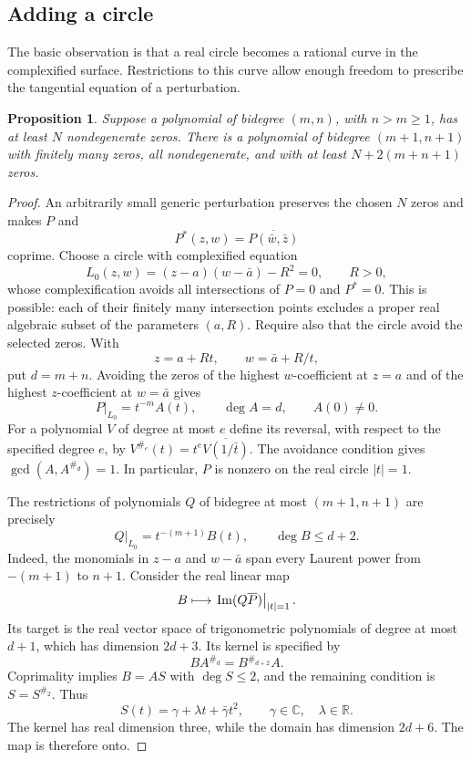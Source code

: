 \documentclass[UTF8,11pt]{ctexart}
\newtheorem{prop}[thm]{Proposition}
\theoremstyle{definition}
\numberwithin{equation}{section}
\newcommand{\C}{\mathbb C}\newcommand{\R}{\mathbb R}
\begin{document}
\subsection{Adding a circle}
The basic observation is that a real circle becomes a rational curve
in the complexified surface. Restrictions to this curve allow enough
freedom to prescribe the tangential equation of a perturbation.
\begin{prop}\label{b:prop:circleaddition}
Suppose a polynomial of bidegree $(m,n)$, with $n>m\ge1$, has at
least $N$ nondegenerate zeros. There is a polynomial of bidegree
$(m+1,n+1)$ with finitely many zeros, all nondegenerate, and with
at least $N+2(m+n+1)$ zeros.
\end{prop}
\begin{proof}
An arbitrarily small generic perturbation preserves the chosen $N$
zeros and makes $P$ and
\[
 P^*(z,w)=\overline{P(\bar w,\bar z)}
\]
coprime. Choose a circle with complexified equation
\[
 L_0(z,w)=(z-a)(w-\bar a)-R^2=0,\qquad R>0,
\]
whose complexification avoids all intersections of $P=0$ and $P^*=0$.
This is possible: each of their finitely many intersection points
excludes a proper real algebraic subset of the parameters $(a,R)$.
Require also that the circle avoid the selected zeros. With
\[
 z=a+Rt,\qquad w=\bar a+R/t,
\]
put $d=m+n$. Avoiding the zeros of the highest $w$-coefficient at $z=a$ and
of the highest $z$-coefficient at $w=\bar a$ gives
\[
 P|_{L_0}=t^{-m}A(t),\qquad \deg A=d,\qquad A(0)\ne0.
\]
For a polynomial $V$ of degree at most $e$ define its reversal, with
respect to the specified degree $e$, by
$V^{\#_e}(t)=t^e\overline{V(1/\bar t)}$.
The avoidance condition gives $\gcd(A,A^{\#_d})=1$.
In particular, $P$ is nonzero on the real circle $|t|=1$.

The restrictions of polynomials $Q$ of bidegree at most
$(m+1,n+1)$ are precisely
\[
 Q|_{L_0}=t^{-(m+1)}B(t),\qquad \deg B\le d+2.
\]
Indeed, the monomials in $z-a$ and $w-\bar a$ span every Laurent
power from $-(m+1)$ to $n+1$.
Consider the real linear map
\[
 B\longmapsto \left.\operatorname{Im}(Q\overline P)\right|_{|t|=1}.
\]
Its target is the real vector space of trigonometric polynomials of
degree at most $d+1$, which has dimension $2d+3$. Its kernel is
specified by
\[
 BA^{\#_d}=B^{\#_{d+2}}A.
\]
Coprimality implies $B=AS$ with $\deg S\le2$, and the remaining
condition is $S=S^{\#_2}$. Thus
\[
 S(t)=\gamma+\lambda t+\bar\gamma t^2,
 \qquad \gamma\in\C,\quad\lambda\in\R.
\]
The kernel has real dimension three, while the domain has dimension
$2d+6$. The map is therefore onto.


\end{proof}
\end{document}
